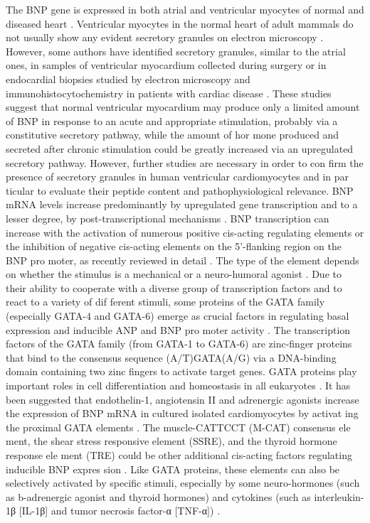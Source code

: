 \documentclass[14pt,a4paper,onecolumn]{extarticle}
\begin{document}
The BNP gene is expressed in both atrial and ventricular myocytes of normal and diseased heart \citep{12-14}\citep{18}. Ventricular myocytes in the normal heart of adult mammals do not usually show any evident secretory granules on electron microscopy \citep{13}\citep{14}.  However, some authors have identified secretory granules, similar to the atrial ones, in samples of ventricular myocardium collected during surgery or in endocardial biopsies studied by electron microscopy and immunohistocytochemistry in patients with cardiac disease \citep{14}\citep{25}\citep{26}. These studies suggest that normal ventricular myocardium may produce only a limited amount of BNP in response to an acute and appropriate stimulation, probably via a constitutive secretory pathway, while the amount of hor mone produced and secreted after chronic stimulation could be greatly increased via an upregulated secretory pathway. However, further studies are necessary in order to con firm the presence of secretory granules in human ventricular cardiomyocytes and in par ticular to evaluate their peptide content and pathophysiological relevance.  BNP mRNA levels increase predominantly by upregulated gene transcription and to a lesser degree, by post-transcriptional mechanisms \citep{22}. BNP transcription can increase with the activation of numerous positive cis-acting regulating elements or the inhibition of negative cis-acting elements on the 5’-flanking region on the BNP pro moter, as recently reviewed in detail \citep{18}\citep{22}. The type of the element depends on whether the stimulus is a mechanical or a neuro-humoral agonist \citep{22}\citep{23}. Due to their ability to cooperate with a diverse group of transcription factors and to react to a variety of dif ferent stimuli, some proteins of the GATA family (especially GATA-4 and GATA-6) emerge as crucial factors in regulating basal expression and inducible ANP and BNP pro moter activity \citep{18}\citep{23}. The transcription factors of the GATA family (from GATA-1 to GATA-6) are zinc-finger proteins that bind to the consensus sequence (A/T)GATA(A/G) via a DNA-binding domain containing two zinc fingers to activate target genes. GATA proteins play important roles in cell differentiation and homeostasis in all eukaryotes \citep{23}. It has been suggested that endothelin-1, angiotensin II and adrenergic agonists increase the expression of BNP mRNA in cultured isolated cardiomyocytes by activat ing the proximal GATA elements \citep{22}. The muscle-CATTCCT (M-CAT) consensus ele ment, the shear stress responsive element (SSRE), and the thyroid hormone response ele ment (TRE) could be other additional cis-acting factors regulating inducible BNP expres sion \citep{18}\citep{22}. Like GATA proteins, these elements can also be selectively activated by specific stimuli, especially by some neuro-hormones (such as b-adrenergic agonist and thyroid hormones) and cytokines (such as interleukin-1β [IL-1β] and tumor necrosis factor-α [TNF-α]) \citep{22}.
\end{document}

